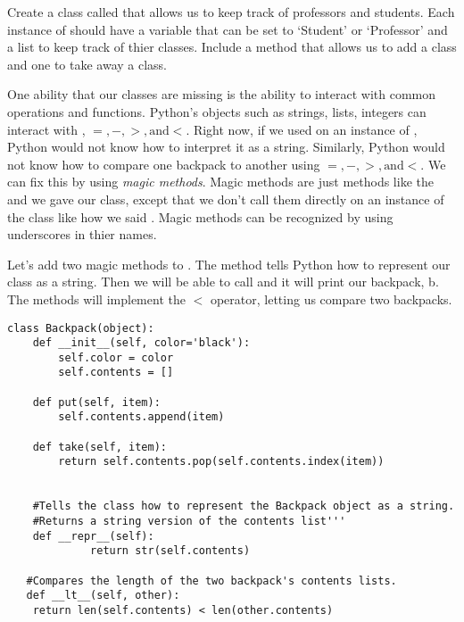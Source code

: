 \begin{problem}
Create a class called  that allows us to keep track of professors and students.
Each instance of  should have a variable that can be set to `Student' or `Professor' and a list to keep track of thier classes.
Include a method that allows us to add a class and one to take away a class.
\label{School}
\end{problem}

One ability that our classes are missing is the ability to interact with common operations and functions.
Python's objects such as strings, lists, integers can interact with ,  $ =, - , >, \text{and} <$.
Right now, if we used  on an instance of , Python would not know how to interpret it as a string.
Similarly, Python would not know how to compare one backpack to another using $ =, - , >, \text{and} <$.
We can fix this by using \emph{magic methods}.
Magic methods are just methods like the  and  we gave our  class, except that we don't call them directly on an instance of the class like how we said .
Magic methods can be recognized by using underscores in thier names.

Let's add two magic methods to . 
The  method tells Python how to represent our class as a string. 
Then we will be able to call  and it will print our backpack, b.
The  methods will implement the $<$ operator, letting us compare two backpacks.

\begin{lstlisting}
class Backpack(object):
    def __init__(self, color='black'):
        self.color = color
        self.contents = []
        
    def put(self, item):
        self.contents.append(item)
        
    def take(self, item):
        return self.contents.pop(self.contents.index(item)) 

             
    #Tells the class how to represent the Backpack object as a string.
    #Returns a string version of the contents list'''   
    def __repr__(self):
             return str(self.contents)
             
   #Compares the length of the two backpack's contents lists.     
   def __lt__(self, other):
   	return len(self.contents) < len(other.contents)

\end{lstlisting}

